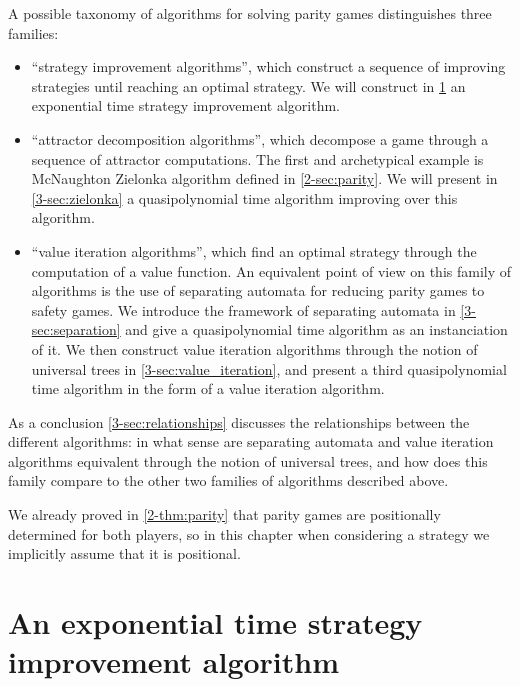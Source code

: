 

A possible taxonomy of algorithms for solving parity games distinguishes three families:
\begin{itemize}
	\item ``strategy improvement algorithms'', which construct a sequence of improving strategies until reaching an optimal strategy. 
	We will construct in \cref{3-sec:strategy_improvement} an exponential time strategy improvement algorithm.
	
	\item ``attractor decomposition algorithms'', which decompose a game through a sequence of attractor computations. 
	The first and archetypical example is McNaughton Zielonka algorithm defined in \cref{2-sec:parity}. 
	We will present in \cref{3-sec:zielonka} a quasipolynomial time algorithm improving over this algorithm.

	\item ``value iteration algorithms'', which find an optimal strategy through the computation of a value function.
	An equivalent point of view on this family of algorithms is the use of separating automata for reducing parity games to safety games.
	We introduce the framework of separating automata in \cref{3-sec:separation} and give a quasipolynomial time algorithm as an instanciation of it. 
	We then construct value iteration algorithms through the notion of universal trees in \cref{3-sec:value_iteration},
	and present a third quasipolynomial time algorithm in the form of a value iteration algorithm.
\end{itemize}

As a conclusion \cref{3-sec:relationships} discusses the relationships between the different algorithms: in what sense are separating automata and value iteration algorithms equivalent through the notion of universal trees, and how does this family compare to the other two families of algorithms described above.

\begin{remark}
We already proved in \cref{2-thm:parity} that parity games are positionally determined for both players, so in this chapter when considering a strategy we implicitly assume that it is positional.
\end{remark}


\section{An exponential time strategy improvement algorithm}
\label{3-sec:strategy_improvement}


